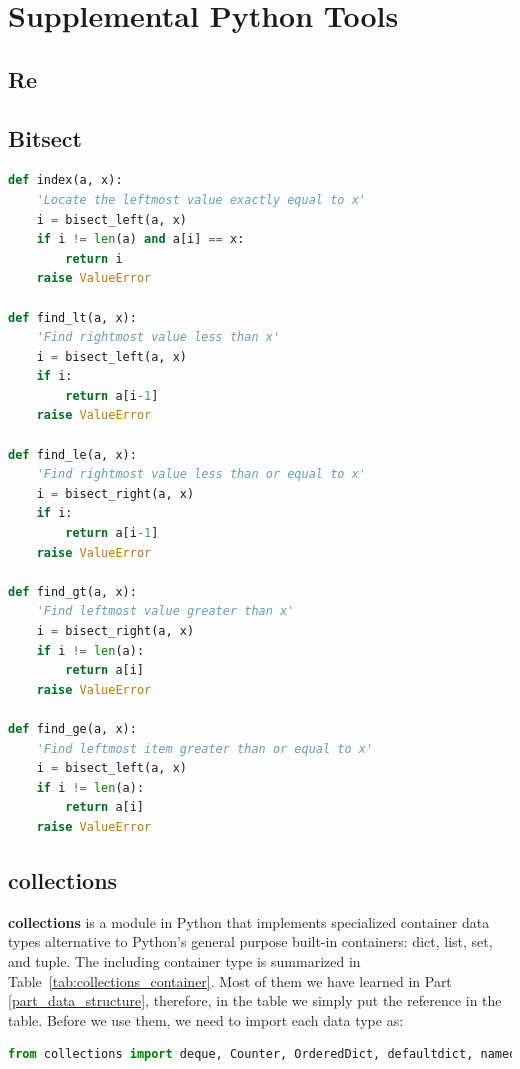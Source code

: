 \documentclass[../main.tex]{subfiles}
\begin{document}
\section{Supplemental Python Tools}
\label{python_sec_supplemental_tools}
\subsection{Re}
\subsection{Bitsect}
\begin{lstlisting}[language = Python]
def index(a, x):
    'Locate the leftmost value exactly equal to x'
    i = bisect_left(a, x)
    if i != len(a) and a[i] == x:
        return i
    raise ValueError

def find_lt(a, x):
    'Find rightmost value less than x'
    i = bisect_left(a, x)
    if i:
        return a[i-1]
    raise ValueError

def find_le(a, x):
    'Find rightmost value less than or equal to x'
    i = bisect_right(a, x)
    if i:
        return a[i-1]
    raise ValueError

def find_gt(a, x):
    'Find leftmost value greater than x'
    i = bisect_right(a, x)
    if i != len(a):
        return a[i]
    raise ValueError

def find_ge(a, x):
    'Find leftmost item greater than or equal to x'
    i = bisect_left(a, x)
    if i != len(a):
        return a[i]
    raise ValueError
\end{lstlisting}

\subsection{collections}
\textbf{collections} is a module in Python that implements specialized container data types alternative to Python's general purpose built-in containers: dict, list, set, and tuple. The including container type is summarized in Table~\ref{tab:collections_container}.  Most of them we have learned in  Part \ref{part_data_structure}, therefore, in the table we simply put the reference in the table. Before we use them, we need to import each data type as:
\begin{lstlisting}[language=Python]
from collections import deque, Counter, OrderedDict, defaultdict, namedtuple
\end{lstlisting}
\end{document}
